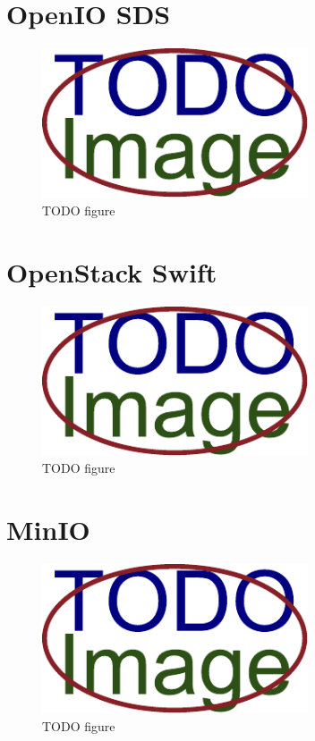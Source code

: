 \section{OpenIO SDS}
    \textcolor{gray}{\Blindtext}
    \begin{figure}[hbt]
        \centering
        \includegraphics[width=0.7\textwidth]{obrazky-figures/placeholder.pdf}
        \caption{TODO figure}
    \end{figure}
\section{OpenStack Swift}
    \textcolor{gray}{\Blindtext}
    \begin{figure}[hbt]
        \centering
        \includegraphics[width=0.7\textwidth]{obrazky-figures/placeholder.pdf}
        \caption{TODO figure}
    \end{figure}
\section{MinIO}
    \textcolor{gray}{\Blindtext}
    \begin{figure}[hbt]
        \centering
        \includegraphics[width=0.7\textwidth]{obrazky-figures/placeholder.pdf}
        \caption{TODO figure}
    \end{figure}

